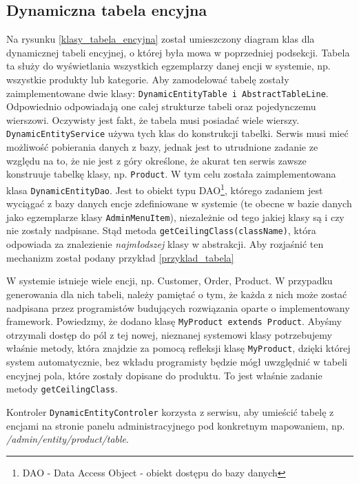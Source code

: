 \subsection{Dynamiczna tabela encyjna}
Na rysunku \ref{klasy_tabela_encyjna} został umieszczony diagram klas dla dynamicznej tabeli encyjnej, o której była mowa w poprzedniej podsekcji. Tabela ta służy do wyświetlania wszystkich egzemplarzy danej encji w systemie, np. wszystkie produkty lub kategorie. Aby zamodelować tabelę zostały zaimplementowane dwie klasy: \texttt{DynamicEntityTable i AbstractTableLine}. Odpowiednio odpowiadają one całej strukturze tabeli oraz pojedynczemu wierszowi. Oczywisty jest fakt, że tabela musi posiadać wiele wierszy. \texttt{DynamicEntityService} używa tych klas do konstrukcji tabelki. Serwis musi mieć możliwość pobierania danych z bazy, jednak jest to utrudnione zadanie ze względu na to, że nie jest z góry określone, że akurat ten serwis zawsze konstruuje tabelkę klasy, np. \texttt{Product}. W tym celu została zaimplementowana klasa \texttt{DynamicEntityDao}. Jest to obiekt typu DAO\footnote{DAO - Data Access Object - obiekt dostępu do bazy danych}, którego zadaniem jest wyciągać z bazy danych encje zdefiniowane w systemie (te obecne w bazie danych jako egzemplarze klasy \texttt{AdminMenuItem}), niezależnie od tego jakiej klasy są i czy nie zostały nadpisane. Stąd metoda \texttt{getCeilingClass(className)}, która odpowiada za znalezienie \textit{najmłodszej} klasy w abstrakcji. Aby rozjaśnić ten mechanizm został podany przykład \ref{przyklad_tabela}
\begin{example}
\label{przyklad_tabela}
	W systemie istnieje wiele encji, np. Customer, Order, Product. W przypadku generowania dla nich tabeli, należy pamiętać o tym, że każda z nich może zostać nadpisana przez programistów budujących rozwiązania oparte o implementowany framework. Powiedzmy, że dodano klasę \texttt{MyProduct extends Product}. Abyśmy otrzymali dostęp do pól z tej nowej, nieznanej systemowi klasy potrzebujemy właśnie metody, która znajdzie za pomocą refleksji klasę \texttt{MyProduct}, dzięki której system automatycznie, bez wkładu programisty będzie mógł uwzględnić w tabeli encyjnej pola, które zostały dopisane do produktu. To jest właśnie zadanie metody \texttt{getCeilingClass}. 
\end{example}
Kontroler \texttt{DynamicEntityControler} korzysta z serwisu, aby umieścić tabelę z encjami na stronie panelu administracyjnego pod konkretnym mapowaniem, np. \textit{/admin/entity/product/table}. 
